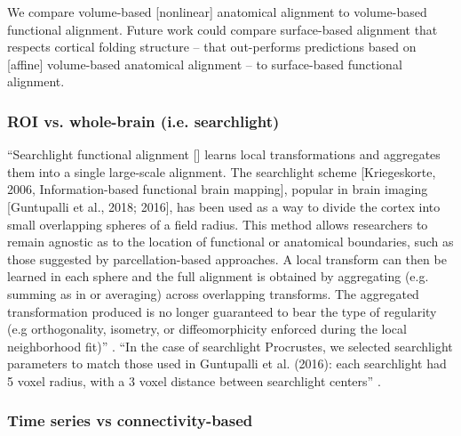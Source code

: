 We compare volume-based [nonlinear] anatomical alignment to volume-based
functional alignment.
%
Future work could compare surface-based alignment that respects cortical folding
structure -- that out-performs predictions based on [affine] volume-based
anatomical alignment \citep{weiner2018defining} -- to surface-based functional
alignment.


\subsubsection{ROI vs. whole-brain (i.e. searchlight)}




``Searchlight functional alignment [\citep{zhang2016searchlight,
guntupalli2016model}] learns local transformations and aggregates them into a
single large-scale alignment.
%
The searchlight scheme [Kriegeskorte, 2006, Information-based functional brain
mapping], popular in brain imaging [Guntupalli et al., 2018; 2016], has been
used as a way to divide the cortex into small overlapping spheres of a field
radius.
%
This method allows researchers to remain agnostic as to the location of
functional or anatomical boundaries, such as those suggested by
parcellation-based approaches.
%
A local transform can then be learned in each sphere and the full alignment is
obtained by aggregating (e.g. summing as in \citep{guntupalli2016model} or
averaging) across overlapping transforms.
%
The aggregated transformation produced is no longer guaranteed to bear the type
of regularity (e.g orthogonality, isometry, or diffeomorphicity enforced during
the local neighborhood fit)'' \citep{bazeille2021empirical}.
%
``In the case of searchlight Procrustes, we selected searchlight parameters to
match those used in Guntupalli et al. (2016):
%
each searchlight had 5 voxel radius, with a 3 voxel distance between searchlight
centers'' \citep{bazeille2021empirical}.


\subsubsection{Time series vs connectivity-based}


